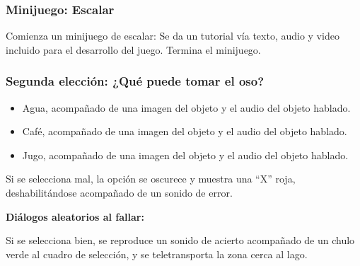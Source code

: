 \begin{play}

\subsubsection*{Minijuego: Escalar}

\begin{stage}
Comienza un minijuego de escalar: Se da un tutorial vía texto, audio y video incluido para el desarrollo del juego.  
Termina el minijuego.
\end{stage}


\subsubsection*{Segunda elección: ¿Qué puede tomar el oso?}


\begin{itemize}
  \item Agua, acompañado de una imagen del objeto y el audio del objeto hablado.
  \item Café, acompañado de una imagen del objeto y el audio del objeto hablado.
  \item Jugo, acompañado de una imagen del objeto y el audio del objeto hablado.
\end{itemize}

\begin{stage}
Si se selecciona mal, la opción se oscurece y muestra una ``X'' roja, deshabilitándose acompañado de un sonido de error.
\end{stage}

\textbf{Diálogos aleatorios al fallar:}


\begin{stage}
Si se selecciona bien, se reproduce un sonido de acierto acompañado de un chulo verde al cuadro de selección, y se teletransporta la zona cerca al lago.
\end{stage}



\end{play}
